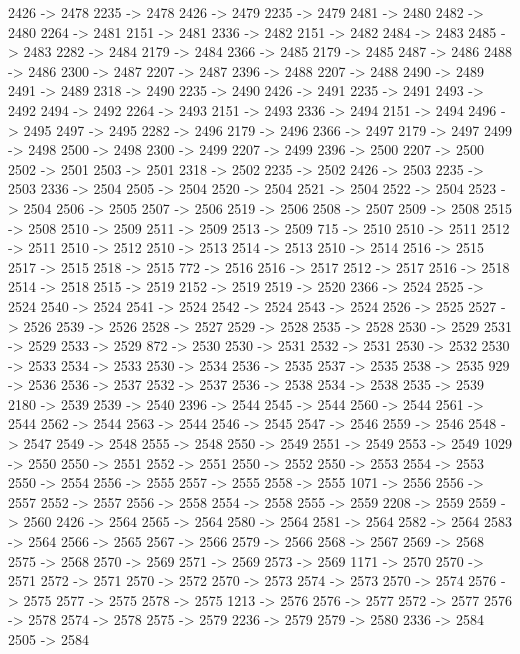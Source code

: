{	2426 -> 2478
	2235 -> 2478
	2426 -> 2479
	2235 -> 2479
	2481 -> 2480
	2482 -> 2480
	2264 -> 2481
	2151 -> 2481
	2336 -> 2482
	2151 -> 2482
	2484 -> 2483
	2485 -> 2483
	2282 -> 2484
	2179 -> 2484
	2366 -> 2485
	2179 -> 2485
	2487 -> 2486
	2488 -> 2486
	2300 -> 2487
	2207 -> 2487
	2396 -> 2488
	2207 -> 2488
	2490 -> 2489
	2491 -> 2489
	2318 -> 2490
	2235 -> 2490
	2426 -> 2491
	2235 -> 2491
	2493 -> 2492
	2494 -> 2492
	2264 -> 2493
	2151 -> 2493
	2336 -> 2494
	2151 -> 2494
	2496 -> 2495
	2497 -> 2495
	2282 -> 2496
	2179 -> 2496
	2366 -> 2497
	2179 -> 2497
	2499 -> 2498
	2500 -> 2498
	2300 -> 2499
	2207 -> 2499
	2396 -> 2500
	2207 -> 2500
	2502 -> 2501
	2503 -> 2501
	2318 -> 2502
	2235 -> 2502
	2426 -> 2503
	2235 -> 2503
	2336 -> 2504
	2505 -> 2504
	2520 -> 2504
	2521 -> 2504
	2522 -> 2504
	2523 -> 2504
	2506 -> 2505
	2507 -> 2506
	2519 -> 2506
	2508 -> 2507
	2509 -> 2508
	2515 -> 2508
	2510 -> 2509
	2511 -> 2509
	2513 -> 2509
	715 -> 2510
	2510 -> 2511
	2512 -> 2511
	2510 -> 2512
	2510 -> 2513
	2514 -> 2513
	2510 -> 2514
	2516 -> 2515
	2517 -> 2515
	2518 -> 2515
	772 -> 2516
	2516 -> 2517
	2512 -> 2517
	2516 -> 2518
	2514 -> 2518
	2515 -> 2519
	2152 -> 2519
	2519 -> 2520
	2366 -> 2524
	2525 -> 2524
	2540 -> 2524
	2541 -> 2524
	2542 -> 2524
	2543 -> 2524
	2526 -> 2525
	2527 -> 2526
	2539 -> 2526
	2528 -> 2527
	2529 -> 2528
	2535 -> 2528
	2530 -> 2529
	2531 -> 2529
	2533 -> 2529
	872 -> 2530
	2530 -> 2531
	2532 -> 2531
	2530 -> 2532
	2530 -> 2533
	2534 -> 2533
	2530 -> 2534
	2536 -> 2535
	2537 -> 2535
	2538 -> 2535
	929 -> 2536
	2536 -> 2537
	2532 -> 2537
	2536 -> 2538
	2534 -> 2538
	2535 -> 2539
	2180 -> 2539
	2539 -> 2540
	2396 -> 2544
	2545 -> 2544
	2560 -> 2544
	2561 -> 2544
	2562 -> 2544
	2563 -> 2544
	2546 -> 2545
	2547 -> 2546
	2559 -> 2546
	2548 -> 2547
	2549 -> 2548
	2555 -> 2548
	2550 -> 2549
	2551 -> 2549
	2553 -> 2549
	1029 -> 2550
	2550 -> 2551
	2552 -> 2551
	2550 -> 2552
	2550 -> 2553
	2554 -> 2553
	2550 -> 2554
	2556 -> 2555
	2557 -> 2555
	2558 -> 2555
	1071 -> 2556
	2556 -> 2557
	2552 -> 2557
	2556 -> 2558
	2554 -> 2558
	2555 -> 2559
	2208 -> 2559
	2559 -> 2560
	2426 -> 2564
	2565 -> 2564
	2580 -> 2564
	2581 -> 2564
	2582 -> 2564
	2583 -> 2564
	2566 -> 2565
	2567 -> 2566
	2579 -> 2566
	2568 -> 2567
	2569 -> 2568
	2575 -> 2568
	2570 -> 2569
	2571 -> 2569
	2573 -> 2569
	1171 -> 2570
	2570 -> 2571
	2572 -> 2571
	2570 -> 2572
	2570 -> 2573
	2574 -> 2573
	2570 -> 2574
	2576 -> 2575
	2577 -> 2575
	2578 -> 2575
	1213 -> 2576
	2576 -> 2577
	2572 -> 2577
	2576 -> 2578
	2574 -> 2578
	2575 -> 2579
	2236 -> 2579
	2579 -> 2580
	2336 -> 2584
	2505 -> 2584
}
